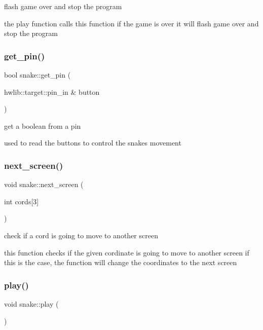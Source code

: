 flash game over and stop the program 

the play function calls this function if the game is over it will flash game over and stop the program \mbox{\label{classsnake_a029848ef2666410aa614fd15164098b3}} 
\subsubsection{\texorpdfstring{get\+\_\+pin()}{get\_pin()}}
{\footnotesize\ttfamily bool snake\+::get\+\_\+pin (\begin{DoxyParamCaption}\item[{hwlib\+::target\+::pin\+\_\+in \&}]{button }\end{DoxyParamCaption})}



get a boolean from a pin 

used to read the buttons to control the snake\textquotesingle{}s movement \mbox{\label{classsnake_abfcdd38b48ecc4e5d14d1f0503bc3c5c}} 
\subsubsection{\texorpdfstring{next\+\_\+screen()}{next\_screen()}}
{\footnotesize\ttfamily void snake\+::next\+\_\+screen (\begin{DoxyParamCaption}\item[{int}]{cords\mbox{[}3\mbox{]} }\end{DoxyParamCaption})}



check if a cord is going to move to another screen 

this function checks if the given cordinate is going to move to another screen if this is the case, the function will change the coordinates to the next screen \mbox{\label{classsnake_aa0125208393f6d3a7b25ea2a2afcf253}} 
\subsubsection{\texorpdfstring{play()}{play()}}
{\footnotesize\ttfamily void snake\+::play (\begin{DoxyParamCaption}{ }\end{DoxyParamCaption})}



